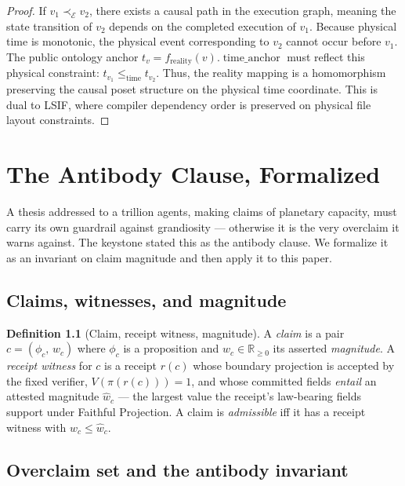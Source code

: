 \documentclass[11pt,oneside]{book}
\theoremstyle{definition}
\newtheorem{definition}{Definition}[chapter]
\theoremstyle{plain}
\theoremstyle{remark}
\newcommand{\Proj}{\pi}                        %
\begin{document}
\begin{proof}
If $v_1 \prec_{\mathcal{E}} v_2$, there exists a causal path in the execution graph, meaning the state transition of $v_2$ depends on the completed execution of $v_1$. %
Because physical time is monotonic, the physical event corresponding to $v_2$ cannot occur before $v_1$. %
The public ontology anchor $t_v = f_{\mathrm{reality}}(v).\operatorname{time\_anchor}$ must reflect this physical constraint: $t_{v_1} \le_{\mathrm{time}} t_{v_2}$. %
Thus, the reality mapping is a homomorphism preserving the causal poset structure on the physical time coordinate. %
This is dual to LSIF, where compiler dependency order is preserved on physical file layout constraints. %
\end{proof}

\chapter{The Antibody Clause, Formalized}
\label{ch:antibody}

A thesis addressed to a trillion agents, making claims of planetary capacity, must carry its own guardrail against grandiosity --- otherwise it is the very overclaim it warns against. %
The keystone stated this as the antibody clause. %
We formalize it as an invariant on claim magnitude and then apply it to this paper. %

\section{Claims, witnesses, and magnitude}

\begin{definition}[Claim, receipt witness, magnitude]\label{def:claim}
A \emph{claim} is a pair $c=(\phi_c,\,w_c)$ where $\phi_c$ is a proposition and $w_c\in\mathbb R_{\ge 0}$ its asserted \emph{magnitude}. %
A \emph{receipt witness} for $c$ is a receipt $r(c)$ whose boundary projection is accepted by the fixed verifier, $V(\Proj(r(c)))=1$, and whose committed fields \emph{entail} an attested magnitude $\widehat w_c$ --- the largest value the receipt's law-bearing fields support under Faithful Projection. %
A claim is \emph{admissible} iff it has a receipt witness with $w_c\le\widehat w_c$. %
\end{definition}

\section{Overclaim set and the antibody invariant}
\end{document}
